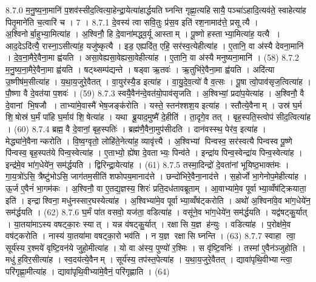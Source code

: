 8.7.0
म॒नु॒ष्य॒ना॒मानि॑ प॒शव॑स्सीद॒त्वित्या॒हेन्द्रा॒येत्या॑हार्द्धयति घ्नन्ति गृह्णा॒त्यहिसायै॒ पञ्चा॑ऽहादि॒त्यव॑ते॒ स्वाहेत्या॑ह पितृ॒माने॑ति च॒त्वारि॑ च । 7 ।
8.7.1
दे॒वस्य॑ त्वा सवि॒तुः प्र॑स॒व इति॑ रश॒नामाद॑त्ते॒ प्रसूत्यै । अ॒श्विनोर्बा॒हुभ्या॒मित्या॑ह । अ॒श्विनौ॒ हि दे॒वाना॑मद्ध्व॒र्यू आस्ताम् । पू॒ष्णो हस्ताभ्या॒मित्या॑ह॒ यत्यै । आद॒देऽदि॑त्यै॒ रास्ना॒ऽसीत्या॑ह॒ यजु॑ष्कृत्यै । इड॒ एह्यदि॑त॒ एहि॒ सर॑स्व॒त्येहीत्या॑ह । ए॒तानि॒ वा अ॑स्यै देवना॒मानि॑ । दे॒व॒ना॒मैरे॒वैना॒मा ह्व॑यति । असा॒वेह्यसा॒वेह्यसा॒वेहीत्या॑ह । ए॒तानि॒ वा अ॑स्यै मनुष्यना॒मानि॑ । (58)
8.7.2
म॒नु॒ष्य॒ना॒मैरे॒वैना॒मा ह्व॑यति । षट्थ्सम्प॑द्यन्ते । षड्वा ऋ॒तवः॑ । ऋ॒तुभि॑रे॒वैना॒मा ह्व॑यति । अदि॑त्या उ॒ष्णीष॑म॒सीत्या॑ह । य॒था॒य॒जुरे॒वैतत् । वा॒युर॑स्यै॒ड इत्या॑ह । वा॒यु॒दे॒व॒त्यो॑ वै व॒त्सः । पू॒षा त्वो॒पाव॑सृज॒त्वित्या॑ह । पौ॒ष्णा वै दे॒वत॑या प॒शवः॑ । (59)
8.7.3
स्वयै॒वैन॑न्दे॒वत॑यो॒पाव॑सृजति । अ॒श्विभ्यां॒ प्रदा॑प॒येत्या॑ह । अ॒श्विनौ॒ वै दे॒वानां भि॒षजौ । ताभ्या॑मे॒वास्मै॑ भेष॒जङ्क॑रोति । यस्ते॒ स्तन॑श्शश॒य इत्या॑ह । स्तौत्ये॒वैनाम् । उस्र॑ घ॒र्म शि॒षोस्र॑ घ॒र्मं पा॑हि घ॒र्माय॑ शि॒षेत्या॑ह । यथा ब्रू॒याद॒मुष्मै॑ दे॒हीति॑ । ता॒दृगे॒व तत् । बृह॒स्पति॒स्त्वोप॑ सीद॒त्वित्या॑ह । (60)
8.7.4
ब्रह्म॒ वै दे॒वानां॒ बृह॒स्पतिः॑ । ब्रह्म॑णै॒वैना॒मुप॑सीदति । दान॑वस्स्थ॒ पेर॑व॒ इत्या॑ह । मेद्ध्या॑ने॒वैनान्करोति । वि॒ष्व॒ग्वृतो॒ लोहि॑ते॒नेत्या॑ह॒ व्यावृ॑त्त्यै । अ॒श्विभ्यां पिन्वस्व॒ सर॑स्वत्यै पिन्वस्व पू॒ष्णे पि॑न्वस्व॒ बृह॒स्पत॑ये पिन्व॒स्वेत्या॑ह । ए॒ताभ्यो॒ ह्ये॑षा दे॒वताभ्यः॒ पिन्व॑ते । इन्द्रा॑य पिन्व॒स्वेन्द्रा॑य पिन्व॒स्वेत्या॑ह । इन्द्र॑मे॒व भा॑ग॒धेये॑न॒ सम॑र्द्धयति । द्विरिन्द्रा॒येत्या॑ह । (61)
8.7.5
तस्मा॒दिन्द्रो॑ दे॒वता॑नां भूयिष्ठ॒भाक्त॑मः । गा॒य॒त्रो॑ऽसि॒ त्रैष्टु॑भोऽसि॒ जाग॑तम॒सीति॑ शफोपय॒मानाद॑त्ते । छन्दो॑भिरे॒वैना॒नाद॑त्ते । स॒होर्जो भा॒गेनोप॒मेहीत्या॑ह । ऊ॒र्ज ए॒वैनं॑ भा॒गम॑कः । अ॒श्विनौ॒ वा ए॒तद्य॒ज्ञस्य॒ शिरः॑ प्रति॒दध॑तावब्रूताम् । आ॒वाभ्या॑मे॒व पूर्वाभ्या॒व्वँष॑ट्क्रियाता॒ इति॑ । इन्द्राश्विना॒ मधु॑नस्सार॒घस्येत्या॑ह । अ॒श्विभ्या॑मे॒व पूर्वाभ्या॒व्वँष॑ट्करोति । अथो॑ अ॒श्विना॑वे॒व भा॑ग॒धेये॑न॒ सम॑र्द्धयति । (62)
8.7.6
घ॒र्मं पा॑त वसवो॒ यज॑ता॒ वडित्या॑ह । वसू॑ने॒व भा॑ग॒धेये॑न॒ सम॑र्द्धयति । यद्व॑षट्कु॒र्यात् । या॒तया॑माऽस्य वषट्का॒रः स्यात् । यन्न व॑षट्कु॒र्यात् । रक्षासि य॒ज्ञ ह॑न्युः । वडित्या॑ह । प॒रोक्ष॑मे॒व वष॑ट्करोति । नास्य॑ या॒तया॑मा वषट्का॒रो भव॑ति । न य॒ज्ञ रक्षासि घ्नन्ति । (63)
8.7.7
स्वाहा त्वा॒ सूर्य॑स्य र॒श्मये॑ वृष्टि॒वन॑ये जुहो॒मीत्या॑ह । यो वा अ॑स्य॒ पुण्यो॑ र॒श्मिः । स वृ॑ष्टि॒वनिः॑ । तस्मा॑ ए॒वैन॑ञ्जुहोति । मधु॑ ह॒विर॒सीत्या॑ह । स्व॒दय॑त्ये॒वैनम् । सूर्य॑स्य॒ तप॑स्त॒पेत्या॑ह । य॒था॒य॒जुरे॒वैतत् । द्यावा॑पृथि॒वीभ्यान्त्वा॒ परि॑गृह्णा॒मीत्या॑ह । द्यावा॑पृथि॒वीभ्या॑मे॒वैनं॒ परि॑गृह्णाति । (64)
